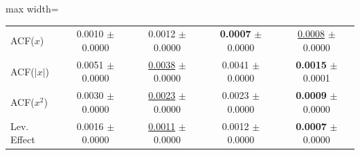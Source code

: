 \documentclass[sigconf,natbib=false]{acmart}
\begin{document}
\begin{table}[htbp]
\begin{adjustbox}{max width=\textwidth}
\begin{tabular}{l|cccc}
ACF($x$)
& 0.0010 $\pm$ 0.0000
& 0.0012 $\pm$ 0.0000
& \textbf{0.0007} $\pm$ 0.0000
& \underline{0.0008} $\pm$ 0.0000 \\
ACF($|x|$)
& 0.0051 $\pm$ 0.0000
& \underline{0.0038} $\pm$ 0.0000
& 0.0041 $\pm$ 0.0000
& \textbf{0.0015} $\pm$ 0.0001 \\
ACF($x^2$)
& 0.0030 $\pm$ 0.0000
& \underline{0.0023} $\pm$ 0.0000
& 0.0023 $\pm$ 0.0000
& \textbf{0.0009} $\pm$ 0.0000 \\
\midrule
Lev. Effect
& 0.0016 $\pm$ 0.0000
& \underline{0.0011} $\pm$ 0.0000
& 0.0012 $\pm$ 0.0000
& \textbf{0.0007} $\pm$ 0.0000 \\
\bottomrule
\end{tabular}
\end{adjustbox}
\end{table}
\end{document}

